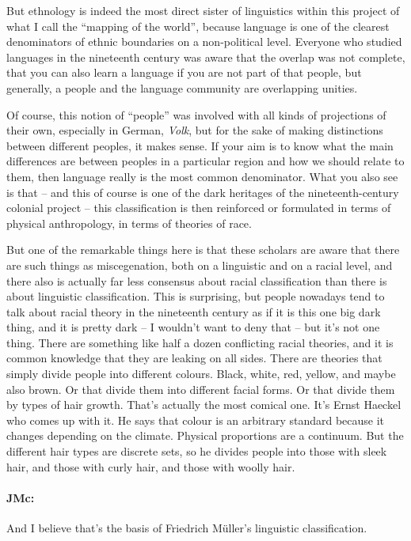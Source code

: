 \documentclass[output=paper]{langscibook}
\begin{document}
But ethnology is indeed the most direct sister of linguistics within this project of what I call the ``mapping of the world'', because language is one of the clearest denominators of ethnic boundaries on a non-political level. Everyone who studied languages in the nineteenth century was aware that the overlap was not complete, that you can also learn a language if you are not part of that people, but generally, a people and the language community are overlapping unities. 

Of course, this notion of “people” was involved with all kinds of projections of their own, especially in German, \textit{Volk}, but for the sake of making distinctions between different peoples, it makes sense. If your aim is to know what the main differences are between peoples in a particular region and how we should relate to them, then language really is the most common denominator. What you also see is that – and this of course is one of the dark heritages of the nineteenth-century colonial project – this classification is then reinforced or formulated in terms of physical anthropology, in terms of theories of race. 

But one of the remarkable things here is that these scholars are aware that there are such things as miscegenation, both on a linguistic and on a racial level, and there also is actually far less consensus about racial classification than there is about linguistic classification. This is surprising, but people nowadays tend to talk about racial theory in the nineteenth century as if it is this one big dark thing, and it is pretty dark – I wouldn’t want to deny that – but it’s not one thing. There are something like half a dozen conflicting racial theories, and it is common knowledge that they are leaking on all sides. There are theories that simply divide people into different colours. Black, white, red, yellow, and maybe also brown. Or that divide them into different facial forms. Or that divide them by types of hair growth. That’s actually the most comical one. It’s Ernst Haeckel who comes up with it. He says that colour is an arbitrary standard because it changes depending on the climate. Physical proportions are a continuum. But the different hair types are discrete sets, so he divides people into those with sleek hair, and those with curly hair, and those with woolly hair.


\paragraph*{JMc:}  And I believe that’s the basis of Friedrich Müller’s linguistic classification.
\end{document}

